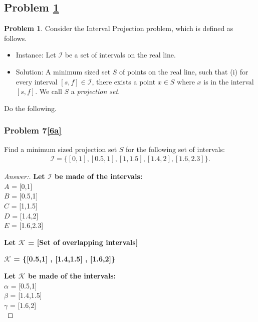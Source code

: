 \documentclass[11pt]{article}
\theoremstyle{definition}
\theoremstyle{definition}
\newtheorem{required}{Problem}
\theoremstyle{definition}
\begin{document}
\subsection{Problem \ref{Exchange2}}
\begin{required} \label{Exchange2}
Consider the \textsf{Interval Projection} problem, which is defined as follows.
\begin{itemize}
\item \textsf{Instance:} Let $\mathcal{I}$ be a set of intervals on the real line.
\item \textsf{Solution:} A minimum sized set $S$ of points on the real line, such that (i) for every interval $[s, f] \in \mathcal{I}$, there exists a point $x \in S$ where $x$ is in the interval $[s, f]$. We call $S$ a \textit{projection set}.
\end{itemize}

\noindent Do the following. 
\begin{enumerate}[label=(\alph*)]
\subsubsection{Problem 7\ref{6a}}
\item \label{6a} Find a minimum sized projection set $S$ for the following set of intervals:
\begin{align*}
\mathcal{I} = \{ [0, 1], [0.5, 1], [1, 1.5], [1.4, 2], [1.6, 2.3] \}.
\end{align*}


\begin{proof}[Answer:]
\item \textbf{Let $\mathcal{I}$ be made of the intervals:} \\
$A$ = [0,1] \\
$B$ = [0.5,1] \\
$C$ = [1,1.5] \\
$D$ = [1.4,2] \\
$E$ = [1.6,2.3] \\

\item \textbf{Let $\mathcal{K}$ = [Set of overlapping intervals]}
\item \textbf{$\mathcal{K}$ = \{[0.5,1] , [1.4,1.5] , [1.6,2]\}} \\
\item \textbf{Let $\mathcal{K}$ be made of the intervals:} \\
$\alpha$ = [0.5,1] \\
$\beta$ = [1.4,1.5] \\
$\gamma$ = [1.6,2] \\


\end{proof}
\end{enumerate}
\end{required}
\end{document}
